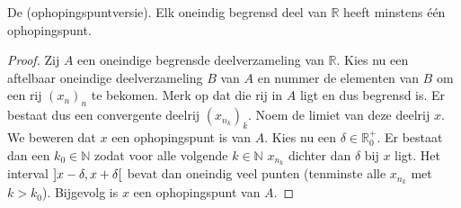 \documentclass[main.tex]{subfiles}
\begin{document}
\begin{bst}
  De  (ophopingspuntversie).
  Elk oneindig begrensd deel van $\mathbb{R}$ heeft minstens \'e\'en ophopingspunt.

  \begin{proof}
    Zij $A$ een oneindige begrensde deelverzameling van $\mathbb{R}$.
    Kies nu een aftelbaar oneindige deelverzameling $B$ van $A$ en nummer de elementen van $B$ om een rij $(x_{n})_{n}$ te bekomen.
    Merk op dat die rij in $A$ ligt en dus begrensd is.
    Er bestaat dus een convergente deelrij $(x_{n_{k}})_{k}$.
    Noem de limiet van deze deelrij $x$.
    We beweren dat $x$ een ophopingspunt is van $A$.
    Kies nu een $\delta \in \mathbb{R}_{0}^{+}$.
    Er bestaat dan een $k_{0}\in\mathbb{N}$ zodat voor alle volgende $k\in \mathbb{N}$ $x_{n_{k}}$ dichter dan $\delta$ bij $x$ ligt.
    Het interval $\interval[open]{x-\delta}{x+\delta}$ bevat dan oneindig veel punten (tenminste alle $x_{n_{k}}$ met $k>k_{0}$).
    Bijgevolg is $x$ een ophopingspunt van $A$.
  \end{proof}
\end{bst}
\end{document}
